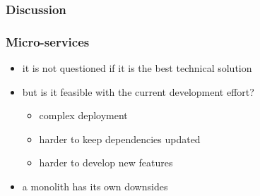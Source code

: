 \documentclass{beamer}
\begin{document}
  \begin{frame}
    \frametitle{Discussion}
    \frametitle{Micro-services}

    \begin{itemize}
      \item it is not questioned if it is the best technical solution
      \item but is it feasible with the current development effort?
        \begin{itemize}
          \item complex deployment
          \item harder to keep dependencies updated
          \item harder to develop new features
        \end{itemize}
      \item a monolith has its own downsides
    \end{itemize}
  \end{frame}
\end{document}
